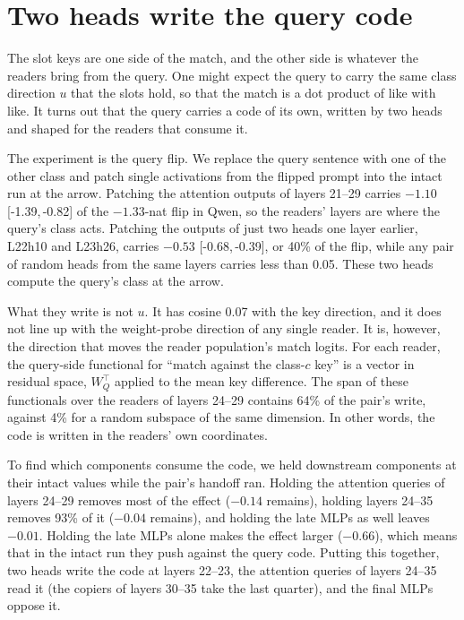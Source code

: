 \documentclass{article}
\newcommand{\ci}[2]{[#1,\,#2]}
\newcommand{\head}[2]{L#1h#2}
\begin{document}
\section{Two heads write the query code}\label{sec:query}
The slot keys are one side of the match, and the other side is whatever the readers bring from the query. One might expect the query to carry the same class direction $u$ that the slots hold, so that the match is a dot product of like with like. It turns out that the query carries a code of its own, written by two heads and shaped for the readers that consume it.

The experiment is the query flip. We replace the query sentence with one of the other class and patch single activations from the flipped prompt into the intact run at the arrow. Patching the attention outputs of layers 21--29 carries $-1.10$ \ci{-1.39}{-0.82} of the $-1.33$-nat flip in Qwen, so the readers' layers are where the query's class acts. Patching the outputs of just two heads one layer earlier, \head{22}{10} and \head{23}{26}, carries $-0.53$ \ci{-0.68}{-0.39}, or 40\% of the flip, while any pair of random heads from the same layers carries less than 0.05. These two heads compute the query's class at the arrow.

What they write is not $u$. It has cosine 0.07 with the key direction, and it does not line up with the weight-probe direction of any single reader. It is, however, the direction that moves the reader population's match logits. For each reader, the query-side functional for ``match against the class-$c$ key'' is a vector in residual space, $W_Q^\top$ applied to the mean key difference. The span of these functionals over the readers of layers 24--29 contains 64\% of the pair's write, against 4\% for a random subspace of the same dimension. In other words, the code is written in the readers' own coordinates.

To find which components consume the code, we held downstream components at their intact values while the pair's handoff ran. Holding the attention queries of layers 24--29 removes most of the effect ($-0.14$ remains), holding layers 24--35 removes 93\% of it ($-0.04$ remains), and holding the late MLPs as well leaves $-0.01$. Holding the late MLPs alone makes the effect larger ($-0.66$), which means that in the intact run they push against the query code. Putting this together, two heads write the code at layers 22--23, the attention queries of layers 24--35 read it (the copiers of layers 30--35 take the last quarter), and the final MLPs oppose it.
\end{document}
